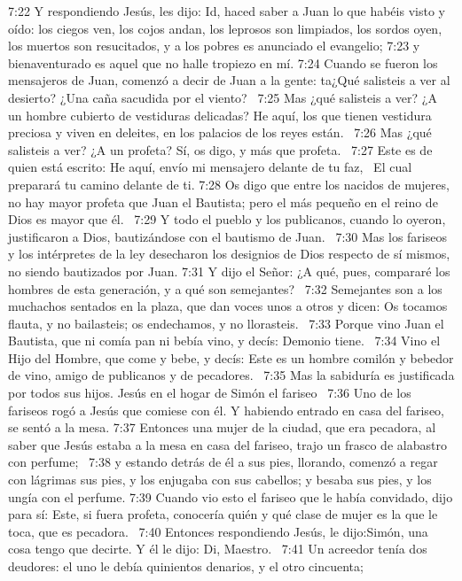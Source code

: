 7:22 Y respondiendo Jesús, les dijo: Id, haced saber a Juan lo que habéis visto y oído: los ciegos ven, los cojos andan, los leprosos son limpiados, los sordos oyen, los muertos son resucitados, y a los pobres es anunciado el evangelio; 
7:23 y bienaventurado es aquel que no halle tropiezo en mí. 
7:24 Cuando se fueron los mensajeros de Juan, comenzó a decir de Juan a la gente: ta¿Qué salisteis a ver al desierto? ¿Una caña sacudida por el viento?  
7:25 Mas ¿qué salisteis a ver? ¿A un hombre cubierto de vestiduras delicadas? He aquí, los que tienen vestidura preciosa y viven en deleites, en los palacios de los reyes están.  
7:26 Mas ¿qué salisteis a ver? ¿A un profeta? Sí, os digo, y más que profeta.  
7:27 Este es de quien está escrito: 
He aquí, envío mi mensajero delante de tu faz,  
El cual preparará tu camino delante de ti. 
7:28 Os digo que entre los nacidos de mujeres, no hay mayor profeta que Juan el Bautista; pero el más pequeño en el reino de Dios es mayor que él.  
7:29 Y todo el pueblo y los publicanos, cuando lo oyeron, justificaron a Dios, bautizándose con el bautismo de Juan.  
7:30 Mas los fariseos y los intérpretes de la ley desecharon los designios de Dios respecto de sí mismos, no siendo bautizados por Juan. 
7:31 Y dijo el Señor: ¿A qué, pues, compararé los hombres de esta generación, y a qué son semejantes?  
7:32 Semejantes son a los muchachos sentados en la plaza, que dan voces unos a otros y dicen: Os tocamos flauta, y no bailasteis; os endechamos, y no llorasteis.  
7:33 Porque vino Juan el Bautista, que ni comía pan ni bebía vino, y decís: Demonio tiene.  
7:34 Vino el Hijo del Hombre, que come y bebe, y decís: Este es un hombre comilón y bebedor de vino, amigo de publicanos y de pecadores.  
7:35 Mas la sabiduría es justificada por todos sus hijos. 
Jesús en el hogar de Simón el fariseo  
7:36 Uno de los fariseos rogó a Jesús que comiese con él. Y habiendo entrado en casa del fariseo, se sentó a la mesa. 
7:37 Entonces una mujer de la ciudad, que era pecadora, al saber que Jesús estaba a la mesa en casa del fariseo, trajo un frasco de alabastro con perfume;  
7:38 y estando detrás de él a sus pies, llorando, comenzó a regar con lágrimas sus pies, y los enjugaba con sus cabellos; y besaba sus pies, y los ungía con el perfume. 
7:39 Cuando vio esto el fariseo que le había convidado, dijo para sí: Este, si fuera profeta, conocería quién y qué clase de mujer es la que le toca, que es pecadora.  
7:40 Entonces respondiendo Jesús, le dijo:Simón, una cosa tengo que decirte. Y él le dijo: Di, Maestro.  
7:41 Un acreedor tenía dos deudores: el uno le debía quinientos denarios, y el otro cincuenta;  
